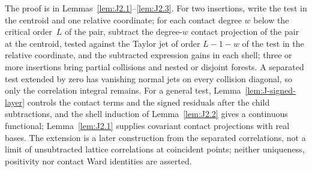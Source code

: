 The proof is in Lemmas~\ref{lem:J2.1}--\ref{lem:J2.3}. For two insertions, write the test in the centroid and one relative coordinate; for each contact degree $w$ below the critical order~$L$ of the pair, subtract the degree-$w$ contact projection of the pair at the centroid, tested against the Taylor jet of order $L-1-w$ of the test in the relative coordinate, and the subtracted expression gains in each shell; three or more insertions bring partial collisions and nested or disjoint forests. A separated test extended by zero has vanishing normal jets on every collision diagonal, so only the correlation integral remains. For a general test, Lemma~\ref{lem:J-signed-layer} controls the contact terms and the signed residuals after the child subtractions, and the shell induction of Lemma~\ref{lem:J2.2} gives a continuous functional; Lemma~\ref{lem:J2.1} supplies covariant contact projections with real bases. The extension is a later construction from the separated correlations, not a limit of unsubtracted lattice correlations at coincident points; neither uniqueness, positivity nor contact Ward identities are asserted.
